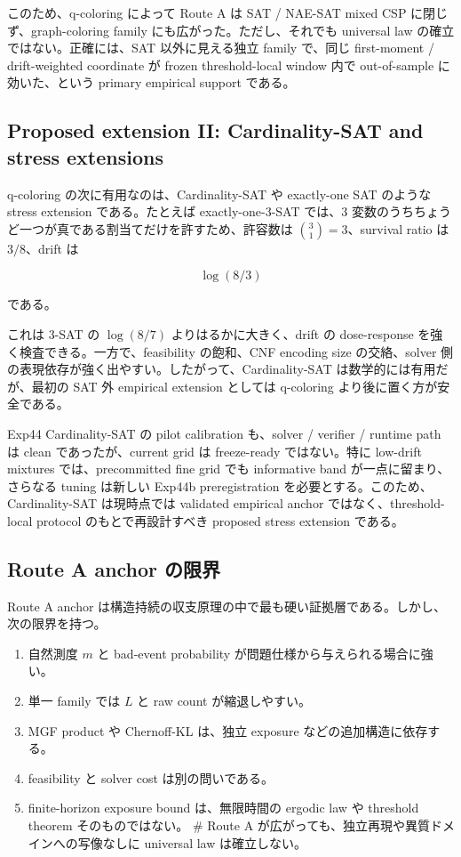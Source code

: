\documentclass[12pt,a4paper]{article}
\begin{document}
このため、q-coloring によって Route A は SAT / NAE-SAT mixed CSP に閉じず、graph-coloring family にも広がった。ただし、それでも universal law の確立ではない。正確には、SAT 以外に見える独立 family で、同じ first-moment / drift-weighted coordinate が frozen threshold-local window 内で out-of-sample に効いた、という primary empirical support である。

\subsection{Proposed extension II: Cardinality-SAT and stress extensions}\label{proposed-extension-ii-cardinality-sat-and-stress-extensions}

q-coloring の次に有用なのは、Cardinality-SAT や exactly-one SAT のような stress extension である。たとえば exactly-one-3-SAT では、3 変数のうちちょうど一つが真である割当てだけを許すため、許容数は \(\binom{3}{1}=3\)、survival ratio は \(3/8\)、drift は

\[
\log(8/3)
\]

である。

これは 3-SAT の \(\log(8/7)\) よりはるかに大きく、drift の dose-response を強く検査できる。一方で、feasibility の飽和、CNF encoding size の交絡、solver 側の表現依存が強く出やすい。したがって、Cardinality-SAT は数学的には有用だが、最初の SAT 外 empirical extension としては q-coloring より後に置く方が安全である。

Exp44 Cardinality-SAT の pilot calibration も、solver / verifier / runtime path は clean であったが、current grid は freeze-ready ではない。特に low-drift mixtures では、precommitted fine grid でも informative band が一点に留まり、さらなる tuning は新しい Exp44b preregistration を必要とする。このため、Cardinality-SAT は現時点では validated empirical anchor ではなく、threshold-local protocol のもとで再設計すべき proposed stress extension である。

\subsection{Route A anchor の限界}\label{route-a-anchor-ux306eux9650ux754c}

Route A anchor は構造持続の収支原理の中で最も硬い証拠層である。しかし、次の限界を持つ。

\begin{enumerate}
\def\labelenumi{\arabic{enumi}.}
\tightlist
\item
  自然測度 \(m\) と bad-event probability が問題仕様から与えられる場合に強い。
\item
  単一 family では \(L\) と raw count が縮退しやすい。
\item
  MGF product や Chernoff-KL は、独立 exposure などの追加構造に依存する。
\item
  feasibility と solver cost は別の問いである。
\item
  finite-horizon exposure bound は、無限時間の ergodic law や threshold theorem そのものではない。 \# Route A が広がっても、独立再現や異質ドメインへの写像なしに universal law は確立しない。
\end{enumerate}
\end{document}
